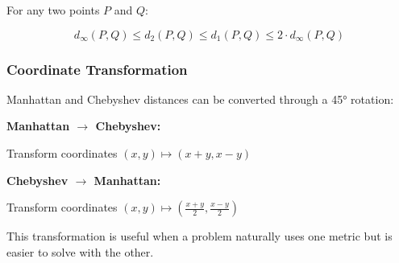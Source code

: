 For any two points $P$ and $Q$:

\begin{equation}
    d_\infty(P, Q) \leq d_2(P, Q) \leq d_1(P, Q) \leq 2 \cdot d_\infty(P, Q)
\end{equation}

\subsubsection{Coordinate Transformation}

Manhattan and Chebyshev distances can be converted through a 45° rotation:

\textbf{Manhattan $\rightarrow$ Chebyshev:}

Transform coordinates $(x, y) \mapsto (x + y, x - y)$

\textbf{Chebyshev $\rightarrow$ Manhattan:}

Transform coordinates $(x, y) \mapsto \left(\frac{x+y}{2}, \frac{x-y}{2}\right)$

This transformation is useful when a problem naturally uses one metric but is easier to solve with the other.
